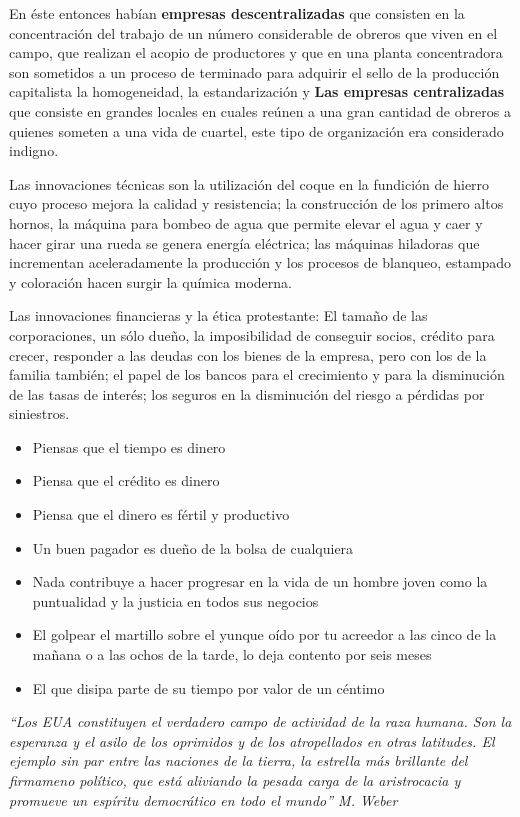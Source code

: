 En éste entonces habían \textbf{empresas descentralizadas} que consisten en la concentración del trabajo de un número considerable de obreros que viven en el campo, que realizan el acopio de productores y que en una planta concentradora son sometidos a un proceso de terminado para adquirir el sello de la producción capitalista la homogeneidad, la estandarización y \textbf{Las empresas centralizadas} que consiste en grandes locales en cuales reúnen a una gran cantidad de obreros a quienes someten a una vida de cuartel, este tipo de organización era considerado indigno.

Las innovaciones técnicas son la utilización del coque en la fundición de hierro cuyo proceso mejora la calidad y resistencia; la construcción de los primero altos hornos, la máquina para bombeo de agua que permite elevar el agua y caer y hacer girar una rueda se genera energía eléctrica; las máquinas hiladoras que incrementan aceleradamente la producción y los procesos de blanqueo, estampado y coloración hacen surgir la química moderna.

Las innovaciones financieras y la ética protestante: El tamaño de las corporaciones, un sólo dueño, la imposibilidad de conseguir socios, crédito para crecer, responder a las deudas con los bienes de la empresa, pero con los de la familia también; el papel de los bancos para el crecimiento y para la disminución de las tasas de interés; los seguros en la disminución del riesgo a pérdidas por siniestros.
\begin{itemize}
    \item Piensas que el tiempo es dinero
    \item Piensa que el crédito es dinero
    \item Piensa que el dinero es fértil y productivo
    \item Un buen pagador es dueño de la bolsa de cualquiera
    \item Nada contribuye a hacer progresar en la vida de un hombre joven como la puntualidad y la justicia en todos sus negocios
    \item El golpear el martillo sobre el yunque oído por tu acreedor a las cinco de la mañana o a las ochos de la tarde, lo deja contento por seis meses
    \item El que disipa parte de su tiempo por valor de un céntimo
\end{itemize}

\emph{``Los EUA constituyen el verdadero campo de actividad de la raza humana. Son la esperanza y el asilo de los oprimidos y de los atropellados en otras latitudes. El ejemplo sin par entre las naciones de la tierra, la estrella más brillante del firmameno político, que está aliviando la pesada carga de la aristrocacia y promueve un espíritu democrático en todo el mundo'' M. Weber}

